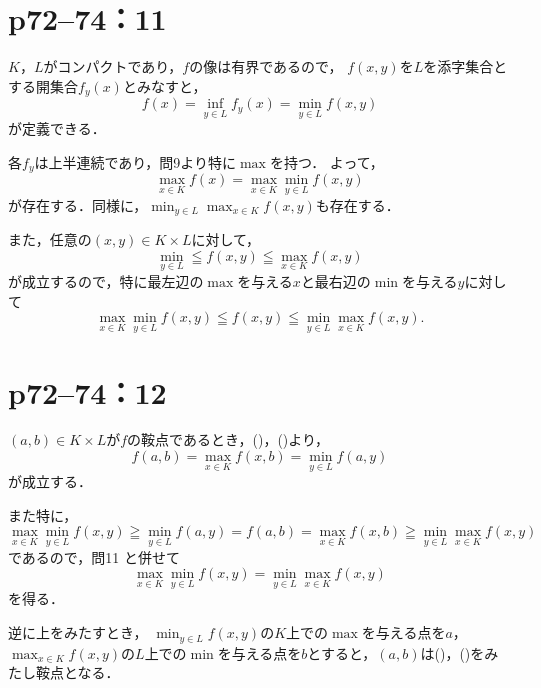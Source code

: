 \section*{p72--74：11}

\begin{tproof}
    $K$，$L$がコンパクトであり，$f$の像は有界であるので，
    $f(x,y)$を$L$を添字集合とする開集合$f_y (x)$とみなすと，
    \[
        f(x) =\inf_{y \in L} f_y (x)=\min_{y \in L} f(x,y)
    \]
    が定義できる．

    各$f_y$は上半連続であり，問9より特に$\max $を持つ．
    よって，
    \[
        \max_{x \in K} f(x) = \max_{x \in K} \min_{y \in L} f(x,y)
    \]
    が存在する．同様に，$\min_{y \in L} \max_{x \in K} f(x,y)$も存在する．

    また，任意の$(x,y) \in K \times L$に対して，
    \[
        \min_{y \in L} \leqq f(x,y) \leqq \max_{x \in K} f(x,y)
    \]
    が成立するので，特に最左辺の$\max$を与える$x$と最右辺の$\min$を与える$y$に対して
    \[
        \max_{x \in K} \min_{y \in L} f(x,y) \leqq f(x,y) \leqq \min_{y \in L} \max_{x \in K} f(x,y).
    \]
\end{tproof}

\newpage


\section*{p72--74：12}

\begin{tproof}
    $(a,b) \in K \times L$が$f$の鞍点であるとき，()，()より，
    \[
        f(a,b) = \max_{x \in K} f(x,b) = \min_{y \in L} f(a,y)
    \]
    が成立する．

    また特に，
    \[
        \max_{x \in K} \min_{y \in L} f(x,y) \geqq \min_{y \in L} f(a,y) =f(a,b)= \max_{x \in K} f(x,b) \geqq \min_{y \in L} \max_{x \in K} f(x,y)
    \]
    であるので，問11 と併せて
    \[
        \max_{x \in K} \min_{y \in L} f(x,y) = \min_{y \in L} \max_{x \in K} f(x,y)
    \]
    を得る．

    逆に上をみたすとき，
    $\min_{y \in L} f(x,y)$の$K$上での$\max$を与える点を$a$，
    $\max_{x \in K} f(x,y)$の$L$上での$\min$を与える点を$b$とすると，$(a,b)$は()，()をみたし鞍点となる．
\end{tproof}
\newpage


